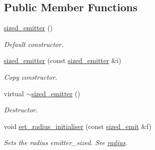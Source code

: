 \subsection*{Public Member Functions}
\begin{DoxyCompactItemize}
\item 
\mbox{\label{classphysim_1_1emitters_1_1sized__emitter_a6e839e4a3b11fe52af69465de569953d}} 
\hyperlink{classphysim_1_1emitters_1_1sized__emitter_a6e839e4a3b11fe52af69465de569953d}{sized\+\_\+emitter} ()
\begin{DoxyCompactList}\small\item\em Default constructor. \end{DoxyCompactList}\item 
\mbox{\label{classphysim_1_1emitters_1_1sized__emitter_a2760b19b00d3ff98a22350ff0e39d9ff}} 
\hyperlink{classphysim_1_1emitters_1_1sized__emitter_a2760b19b00d3ff98a22350ff0e39d9ff}{sized\+\_\+emitter} (const \hyperlink{classphysim_1_1emitters_1_1sized__emitter}{sized\+\_\+emitter} \&i)
\begin{DoxyCompactList}\small\item\em Copy constructor. \end{DoxyCompactList}\item 
\mbox{\label{classphysim_1_1emitters_1_1sized__emitter_ac8e41b9b249d038ab052d3e466a9aa9d}} 
virtual \hyperlink{classphysim_1_1emitters_1_1sized__emitter_ac8e41b9b249d038ab052d3e466a9aa9d}{$\sim$sized\+\_\+emitter} ()
\begin{DoxyCompactList}\small\item\em Destructor. \end{DoxyCompactList}\item 
\mbox{\label{classphysim_1_1emitters_1_1sized__emitter_ac1443c9d4545485bf074c185e1ac511a}} 
void \hyperlink{classphysim_1_1emitters_1_1sized__emitter_ac1443c9d4545485bf074c185e1ac511a}{set\+\_\+radius\+\_\+initialiser} (const \hyperlink{namespacephysim_1_1emitters_a924fdfab5324762db7bded5f2877ff87}{sized\+\_\+emit} \&f)
\begin{DoxyCompactList}\small\item\em Sets the radius emitter\+\_\+sized. See \hyperlink{classphysim_1_1emitters_1_1sized__emitter_a85a42d5a2e35fe7831ab889e1f4a4a45}{radius}. \end{DoxyCompactList}\item 

\end{DoxyCompactItemize}
